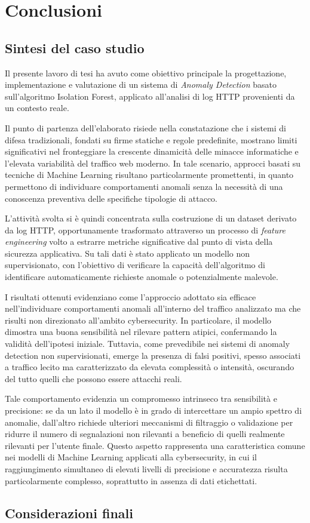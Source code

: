\chapter{Conclusioni}

\section{Sintesi del caso studio}

Il presente lavoro di tesi ha avuto come obiettivo principale la progettazione, implementazione e valutazione di un sistema di \emph{Anomaly Detection} basato sull’algoritmo Isolation Forest, applicato all’analisi di log HTTP provenienti da un contesto reale.

Il punto di partenza dell’elaborato risiede nella constatazione che i sistemi di difesa tradizionali, fondati su firme statiche e regole predefinite, mostrano limiti significativi nel fronteggiare la crescente dinamicità delle minacce informatiche e l’elevata variabilità del traffico web moderno. In tale scenario, approcci basati su tecniche di Machine Learning risultano particolarmente promettenti, in quanto permettono di individuare comportamenti anomali senza la necessità di una conoscenza preventiva delle specifiche tipologie di attacco.

L’attività svolta si è quindi concentrata sulla costruzione di un dataset derivato da log HTTP, opportunamente trasformato attraverso un processo di \emph{feature engineering} volto a estrarre metriche significative dal punto di vista della sicurezza applicativa. Su tali dati è stato applicato un modello non supervisionato, con l’obiettivo di verificare la capacità dell’algoritmo di identificare automaticamente richieste anomale o potenzialmente malevole.

I risultati ottenuti evidenziano come l’approccio adottato sia efficace nell’individuare comportamenti anomali all’interno del traffico analizzato ma che risulti non direzionato all'ambito cybersecurity. In particolare, il modello dimostra una buona sensibilità nel rilevare pattern atipici, confermando la validità dell’ipotesi iniziale. Tuttavia, come prevedibile nei sistemi di anomaly detection non supervisionati, emerge la presenza di falsi positivi, spesso associati a traffico lecito ma caratterizzato da elevata complessità o intensità, oscurando del tutto quelli che possono essere attacchi reali.

Tale comportamento evidenzia un compromesso intrinseco tra sensibilità e precisione: se da un lato il modello è in grado di intercettare un ampio spettro di anomalie, dall’altro richiede ulteriori meccanismi di filtraggio o validazione per ridurre il numero di segnalazioni non rilevanti a beneficio di quelli realmente rilevanti per l'utente finale. Questo aspetto rappresenta una caratteristica comune nei modelli di Machine Learning applicati alla cybersecurity, in cui il raggiungimento simultaneo di elevati livelli di precisione e accuratezza risulta particolarmente complesso, soprattutto in assenza di dati etichettati.

\section{Considerazioni finali}

